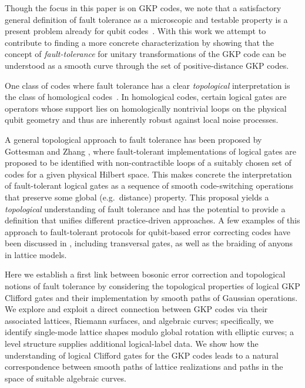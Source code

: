 \documentclass[a4paper, aps, pra, 11pt, onecolumn, tightenlines, superscriptaddress]{revtex4-2}
\begin{document}
Though the focus in this paper is on GKP codes, we note that a satisfactory general definition of fault tolerance as a microscopic and testable property is a present problem already for qubit codes~\cite{GottesmanQECtalk, gottesman2022opportunities}. With this work we attempt to contribute to finding a more concrete characterization by showing that the concept of \emph{fault-tolerance} for unitary transformations of the GKP code can be understood as a smooth curve through the set of positive-distance GKP codes. 

One class of codes where fault tolerance has a clear \emph{topological} interpretation is the class of homological codes~\cite{Kitaev_2003}. 
In homological codes, certain logical gates are operators whose support lies on homologically nontrivial loops on the physical qubit geometry and thus are inherently robust against local noise processes. 

A general topological approach to fault tolerance has been proposed by Gottesman and Zhang \cite{gottesman2017fibre}, where fault-tolerant implementations of logical gates are proposed to be identified with non-contractible loops of a suitably chosen set of codes for a given physical Hilbert space. 
This makes concrete the interpretation of fault-tolerant logical gates as a sequence of smooth code-switching operations that preserve some global (e.g.\ distance) property. 
This proposal yields a \emph{topological} understanding of fault tolerance and has the potential to provide a definition that unifies different practice-driven approaches. 
A few examples of this approach to fault-tolerant protocols for qubit-based error correcting codes have been discussed in \cite{gottesman2017fibre}, including transversal gates, as well as the braiding of anyons in lattice models. 

Here we establish a first link between bosonic error correction and topological notions of fault tolerance by considering the topological properties of logical GKP Clifford gates and their implementation by smooth paths of Gaussian operations. 
We explore and exploit a direct connection between GKP codes via their associated lattices, Riemann surfaces, and algebraic curves; specifically, we identify single-mode lattice shapes modulo global rotation with elliptic curves; a level structure supplies additional logical-label data. 
We show how the understanding of logical Clifford gates for the GKP codes leads to a natural correspondence between smooth paths of lattice realizations and paths in the space of suitable algebraic curves.
\end{document}
